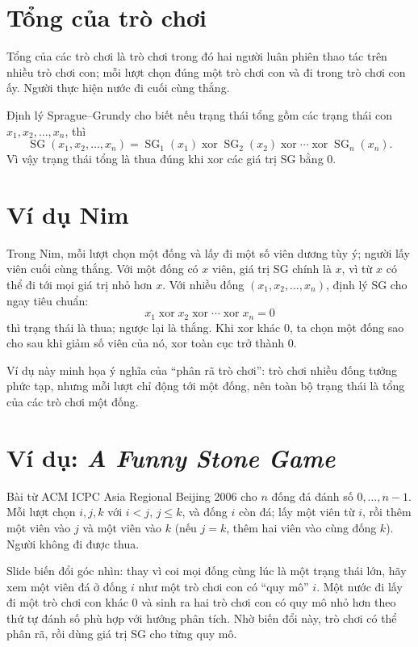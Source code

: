 \documentclass[11pt]{article}
\newcommand{\SG}{\operatorname{SG}}
\newcommand{\xor}{\mathbin{\operatorname{xor}}}
\begin{document}
\section{Tổng của trò chơi}

Tổng của các trò chơi là trò chơi trong đó hai người luân phiên thao tác trên
nhiều trò chơi con; mỗi lượt chọn đúng một trò chơi con và đi trong trò chơi
con ấy. Người thực hiện nước đi cuối cùng thắng.

Định lý Sprague--Grundy cho biết nếu trạng thái tổng gồm các trạng thái con
\(x_1,x_2,\ldots,x_n\), thì
\[
  \SG(x_1,x_2,\ldots,x_n)
  =\SG_1(x_1)\xor\SG_2(x_2)\xor\cdots\xor\SG_n(x_n).
\]
Vì vậy trạng thái tổng là thua đúng khi xor các giá trị SG bằng \(0\).

\section{Ví dụ Nim}

Trong Nim, mỗi lượt chọn một đống và lấy đi một số viên dương tùy ý; người
lấy viên cuối cùng thắng. Với một đống có \(x\) viên, giá trị SG chính là
\(x\), vì từ \(x\) có thể đi tới mọi giá trị nhỏ hơn \(x\). Với nhiều đống
\((x_1,x_2,\ldots,x_n)\), định lý SG cho ngay tiêu chuẩn:
\[
  x_1\xor x_2\xor\cdots\xor x_n=0
\]
thì trạng thái là thua; ngược lại là thắng. Khi xor khác \(0\), ta chọn một
đống sao cho sau khi giảm số viên của nó, xor toàn cục trở thành \(0\).

Ví dụ này minh họa ý nghĩa của ``phân rã trò chơi'': trò chơi nhiều đống tưởng
phức tạp, nhưng mỗi lượt chỉ động tới một đống, nên toàn bộ trạng thái là tổng
của các trò chơi một đống.

\section{Ví dụ: \textit{A Funny Stone Game}}

Bài từ ACM ICPC Asia Regional Beijing 2006 cho \(n\) đống đá đánh số
\(0,\ldots,n-1\). Mỗi lượt chọn \(i,j,k\) với \(i<j\), \(j\le k\), và đống
\(i\) còn đá; lấy một viên từ \(i\), rồi thêm một viên vào \(j\) và một viên
vào \(k\) (nếu \(j=k\), thêm hai viên vào cùng đống \(k\)). Người không đi
được thua.

Slide biến đổi góc nhìn: thay vì coi mọi đống cùng lúc là một trạng thái lớn,
hãy xem một viên đá ở đống \(i\) như một trò chơi con có ``quy mô'' \(i\).
Một nước đi lấy đi một trò chơi con khác \(0\) và sinh ra hai trò chơi con có
quy mô nhỏ hơn theo thứ tự đánh số phù hợp với hướng phân tích. Nhờ biến đổi
này, trò chơi có thể phân rã, rồi dùng giá trị SG cho từng quy mô.
\end{document}

